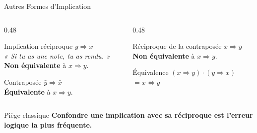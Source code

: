 \begin{frame}{Autres Formes d'Implication}

    \begin{columns}[T]
        \begin{column}{0.48\textwidth}
            \begin{block}{Implication réciproque}
                \(y \Rightarrow x\)\\
                \textit{« Si tu as une note, tu as rendu. »}\\
                \textbf{Non équivalente} à \(x \Rightarrow y\).
            \end{block}

            \vspace{0.2cm}

            \begin{block}{Contraposée}
                \(\bar{y} \Rightarrow \bar{x}\)\\
                \textbf{Équivalente} à \(x \Rightarrow y\).
            \end{block}
        \end{column}
        \begin{column}{0.48\textwidth}
            \begin{block}{Réciproque de la contraposée}
                \(\bar{x} \Rightarrow \bar{y}\)\\
                \textbf{Non équivalente} à \(x \Rightarrow y\).
            \end{block}

            \vspace{0.2cm}

            \begin{block}{Équivalence}
                \((x \Rightarrow y) \cdot (y \Rightarrow x)\)\\
                \(= x \Leftrightarrow y\)
            \end{block}
        \end{column}
    \end{columns}

    \vspace{0.4cm}

    \begin{alertblock}{Piège classique}
        \centering
        \textbf{Confondre une implication avec sa réciproque est l'erreur logique la plus fréquente.}
    \end{alertblock}

\end{frame}
